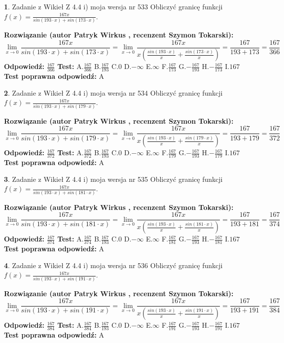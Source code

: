 \documentclass[12pt, a4paper]{article}
\theoremstyle{definition} %
\newtheorem{zad}{}
\newcommand{\zadStart}[1]{\begin{zad}#1\newline}
\newcommand{\zadStop}{\end{zad}}
\newcommand{\rozwStart}[2]{\noindent \textbf{Rozwiązanie (autor #1 , recenzent #2): }\newline}
\newcommand{\rozwStop}{\newline}
\newcommand{\odpStart}{\noindent \textbf{Odpowiedź:}\newline}
\newcommand{\odpStop}{\newline}
\newcommand{\testStart}{\noindent \textbf{Test:}\newline}
\newcommand{\testStop}{\newline}
\newcommand{\kluczStart}{\noindent \textbf{Test poprawna odpowiedź:}\newline}
\newcommand{\kluczStop}{\newline}
\begin{document}
\zadStart{Zadanie z Wikieł Z 4.4 i) moja wersja nr 533}
Obliczyć granicę funkcji $f(x)=\frac{167x}{sin(193\cdot x) +sin(173\cdot x)}$.
\zadStop
\rozwStart{Patryk Wirkus}{Szymon Tokarski}
$$\lim\limits_{x\to 0}\frac{167x}{sin(193\cdot x) +sin(173\cdot x)}=\lim\limits_{x\to 0}\frac{167x}{x(\frac{sin(193\cdot x)}{x}+\frac{sin(173\cdot x)}{x})}=\frac{167}{193+173} = \frac{167}{366}$$
\rozwStop
\odpStart
$\frac{167}{366}$
\odpStop
\testStart
A.$\frac{167}{366}$
B.$\frac{167}{193}$
C.$0$
D.$-\infty$
E.$\infty$
F.$\frac{167}{173}$
G.$-\frac{167}{193}$
H.$-\frac{167}{173}$
I.$167$
\testStop
\kluczStart
A
\kluczStop



\zadStart{Zadanie z Wikieł Z 4.4 i) moja wersja nr 534}
Obliczyć granicę funkcji $f(x)=\frac{167x}{sin(193\cdot x) +sin(179\cdot x)}$.
\zadStop
\rozwStart{Patryk Wirkus}{Szymon Tokarski}
$$\lim\limits_{x\to 0}\frac{167x}{sin(193\cdot x) +sin(179\cdot x)}=\lim\limits_{x\to 0}\frac{167x}{x(\frac{sin(193\cdot x)}{x}+\frac{sin(179\cdot x)}{x})}=\frac{167}{193+179} = \frac{167}{372}$$
\rozwStop
\odpStart
$\frac{167}{372}$
\odpStop
\testStart
A.$\frac{167}{372}$
B.$\frac{167}{193}$
C.$0$
D.$-\infty$
E.$\infty$
F.$\frac{167}{179}$
G.$-\frac{167}{193}$
H.$-\frac{167}{179}$
I.$167$
\testStop
\kluczStart
A
\kluczStop



\zadStart{Zadanie z Wikieł Z 4.4 i) moja wersja nr 535}
Obliczyć granicę funkcji $f(x)=\frac{167x}{sin(193\cdot x) +sin(181\cdot x)}$.
\zadStop
\rozwStart{Patryk Wirkus}{Szymon Tokarski}
$$\lim\limits_{x\to 0}\frac{167x}{sin(193\cdot x) +sin(181\cdot x)}=\lim\limits_{x\to 0}\frac{167x}{x(\frac{sin(193\cdot x)}{x}+\frac{sin(181\cdot x)}{x})}=\frac{167}{193+181} = \frac{167}{374}$$
\rozwStop
\odpStart
$\frac{167}{374}$
\odpStop
\testStart
A.$\frac{167}{374}$
B.$\frac{167}{193}$
C.$0$
D.$-\infty$
E.$\infty$
F.$\frac{167}{181}$
G.$-\frac{167}{193}$
H.$-\frac{167}{181}$
I.$167$
\testStop
\kluczStart
A
\kluczStop



\zadStart{Zadanie z Wikieł Z 4.4 i) moja wersja nr 536}
Obliczyć granicę funkcji $f(x)=\frac{167x}{sin(193\cdot x) +sin(191\cdot x)}$.
\zadStop
\rozwStart{Patryk Wirkus}{Szymon Tokarski}
$$\lim\limits_{x\to 0}\frac{167x}{sin(193\cdot x) +sin(191\cdot x)}=\lim\limits_{x\to 0}\frac{167x}{x(\frac{sin(193\cdot x)}{x}+\frac{sin(191\cdot x)}{x})}=\frac{167}{193+191} = \frac{167}{384}$$
\rozwStop
\odpStart
$\frac{167}{384}$
\odpStop
\testStart
A.$\frac{167}{384}$
B.$\frac{167}{193}$
C.$0$
D.$-\infty$
E.$\infty$
F.$\frac{167}{191}$
G.$-\frac{167}{193}$
H.$-\frac{167}{191}$
I.$167$
\testStop
\kluczStart
A
\kluczStop
\end{document}
